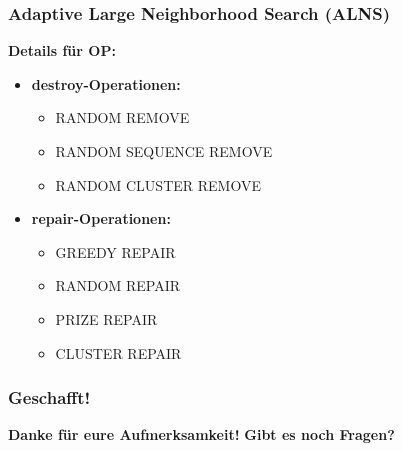 \documentclass{beamer}
\begin{document}
\begin{frame}
  \frametitle{Adaptive Large Neighborhood Search (ALNS)}
  \textbf{Details für OP:}
  \begin{itemize}
    \item \textbf{destroy-Operationen:}
    \begin{itemize}
      \item \textsc{RANDOM REMOVE}
      \item \textsc{RANDOM SEQUENCE REMOVE}
      \item \textsc{RANDOM CLUSTER REMOVE}
    \end{itemize}
    \item \textbf{repair-Operationen:}
    \begin{itemize}
      \item \textsc{GREEDY REPAIR}
      \item \textsc{RANDOM REPAIR}
      \item \textsc{PRIZE REPAIR}
      \item \textsc{CLUSTER REPAIR}
    \end{itemize}
  \end{itemize}
\end{frame}

\begin{frame}
  \frametitle{Geschafft!}
  \textbf{Danke für eure Aufmerksamkeit!}
  \newline
  \newline
  \textbf{Gibt es noch Fragen?}
\end{frame}
\end{document}
